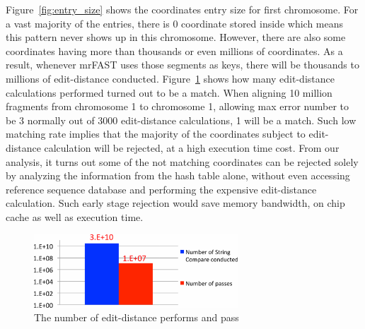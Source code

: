 Figure~\ref{fig:entry_size} shows the coordinates entry size for first chromosome.
For a vast majority of the entries, there is 0 coordinate stored inside which
means this pattern never shows up in this chromosome. However, there are also
some coordinates having more than thousands or even millions of coordinates. As
a result, whenever mrFAST uses those segments as keys, there will be thousands
to millions of edit-distance conducted. Figure~\ref{fig:edit_dist} shows how many
edit-distance calculations performed turned out to be a match. When aligning 10
million fragments from chromosome 1 to chromosome 1, allowing max error number
to be 3 normally out of 3000 edit-distance calculations, 1 will be a match.
Such low matching rate implies that the majority of the coordinates subject to
edit-distance calculation will be rejected, at a high execution time cost.
From our analysis, it turns out some of the not matching coordinates can be
rejected solely by analyzing the information from the hash table alone, without
even accessing reference sequence database and performing the expensive
edit-distance calculation. Such early stage rejection would save memory
bandwidth, on chip cache as well as execution time.\\

\begin{figure}[t] 
\centering
\vspace{0.1in}
\includegraphics[width=3in]{./figure/Edit_Perform_B.pdf} \vspace{0in}
\caption{The number of edit-distance performs and pass}
\label{fig:edit_dist} 
\end{figure}

